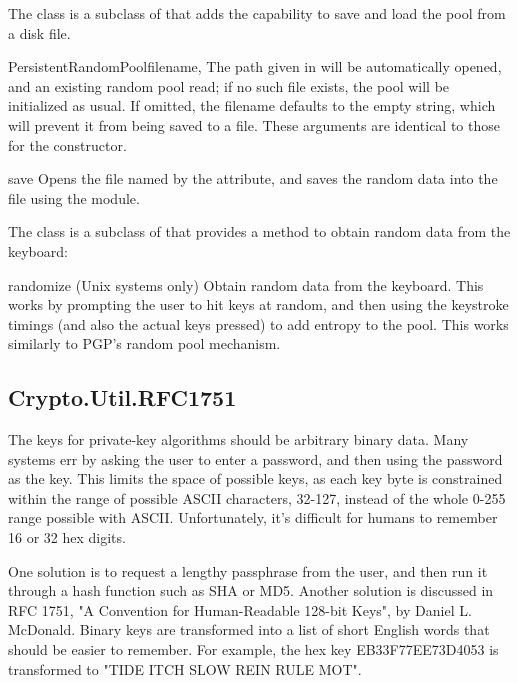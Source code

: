 \documentclass{howto}
\begin{document}
The  class is a subclass of 
that adds the capability to save and load the pool from a disk file.

\begin{classdesc}{PersistentRandomPool}{filename, }
The path given in  will be automatically opened, and an
existing random pool read; if no such file exists, the pool will be
initialized as usual.  If omitted, the filename defaults to the empty
string, which will prevent it from being saved to a file.  These
arguments are identical to those for the 
constructor.
\end{classdesc}

\begin{methoddesc}{save}{}
Opens the file named by the  attribute, and saves the
random data into the file using the  module.
\end{methoddesc}

The  class is a subclass of
 that provides a method to obtain random
data from the keyboard:

\begin{methoddesc}{randomize}{}
(Unix systems only)  Obtain random data from the keyboard.  This works
by prompting the
user to hit keys at random, and then using the keystroke timings (and
also the actual keys pressed) to add entropy to the pool.  This works
similarly to PGP's random pool mechanism.
\end{methoddesc}


\subsection{Crypto.Util.RFC1751}
The keys for private-key algorithms should be arbitrary binary data.
Many systems err by asking the user to enter a password, and then
using the password as the key.  This limits the space of possible
keys, as each key byte is constrained within the range of possible
ASCII characters, 32-127, instead of the whole 0-255 range possible
with ASCII.  Unfortunately, it's difficult for humans to remember 16
or 32 hex digits.

One solution is to request a lengthy passphrase from the user, and
then run it through a hash function such as SHA or MD5.  Another
solution is discussed in RFC 1751, "A Convention for Human-Readable
128-bit Keys", by Daniel L. McDonald.  Binary keys are transformed
into a list of short English words that should be easier to remember.
For example, the hex key EB33F77EE73D4053 is transformed to "TIDE ITCH
SLOW REIN RULE MOT".
\end{document}
